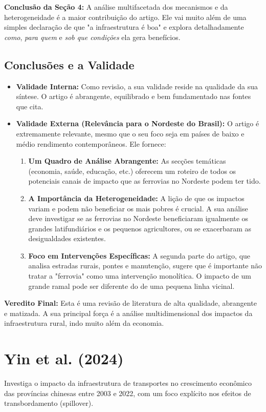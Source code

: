 \documentclass[12pt, a4paper]{article}
\begin{document}
\noindent\textbf{Conclusão da Seção 4:} A análise multifacetada dos mecanismos e da heterogeneidade é a maior contribuição do artigo. Ele vai muito além de uma simples declaração de que "a infraestrutura é boa" e explora detalhadamente \textit{como}, \textit{para quem} e \textit{sob que condições} ela gera benefícios.

\subsection{Conclusões e a Validade}
\begin{itemize}
    \item \textbf{Validade Interna:} Como revisão, a sua validade reside na qualidade da sua síntese. O artigo é abrangente, equilibrado e bem fundamentado nas fontes que cita.
    \item \textbf{Validade Externa (Relevância para o Nordeste do Brasil):} O artigo é extremamente relevante, mesmo que o seu foco seja em países de baixo e médio rendimento contemporâneos. Ele fornece:
        \begin{enumerate}
            \item \textbf{Um Quadro de Análise Abrangente:} As secções temáticas (economia, saúde, educação, etc.) oferecem um roteiro de todos os potenciais canais de impacto que as ferrovias no Nordeste podem ter tido. 
            \item \textbf{A Importância da Heterogeneidade:} A lição de que os impactos variam e podem não beneficiar os mais pobres é crucial. A sua análise deve investigar se as ferrovias no Nordeste beneficiaram igualmente os grandes latifundiários e os pequenos agricultores, ou se exacerbaram as desigualdades existentes.
            \item \textbf{Foco em Intervenções Específicas:} A segunda parte do artigo, que analisa estradas rurais, pontes e manutenção, sugere que é importante não tratar a "ferrovia" como uma intervenção monolítica. O impacto de um grande ramal pode ser diferente do de uma pequena linha vicinal.
        \end{enumerate}
\end{itemize}

\noindent\textbf{Veredito Final:} Esta é uma revisão de literatura de alta qualidade, abrangente e matizada. A sua principal força é a análise multidimensional dos impactos da infraestrutura rural, indo muito além da economia. 

\section{Yin et al. (2024)}
Investiga o impacto da infraestrutura de transportes no crescimento econômico das províncias chinesas entre 2003 e 2022, com um foco explícito nos efeitos de transbordamento (spillover).
\end{document}
